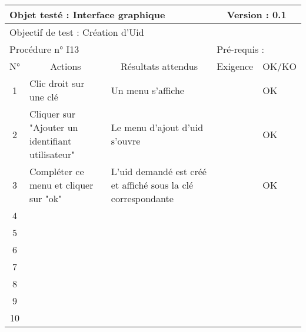 \documentclass{../res/univ-projet}
\begin{document}
\begin{center}
    \begin{tabular}{|c|p{5cm}|p{5cm}|p{1.5cm}|p{1.5cm}|}
      \hline
      \multicolumn{3}{|l|}{Objet testé : Interface graphique} & \multicolumn{2}{c|}{Version : 0.1}\\ \hline
      \multicolumn{5}{|l|}{Objectif de test : Création d'Uid}\\ \hline
      \multicolumn{3}{|l|}{Procédure n° I13} & \multicolumn{2}{p{3cm}|}{Pré-requis : }\\ \hline
      \multicolumn{1}{|c|}{N°} & \multicolumn{1}{c|}{Actions} & \multicolumn{1}{c|}{Résultats attendus} & 
      \multicolumn{1}{c|}{Exigence} & \multicolumn{1}{c|}{OK/KO}\\ \hline
      1 & Clic droit sur une clé & Un menu s'affiche &  & OK \\
      2 & Cliquer sur "Ajouter un identifiant utilisateur" & Le menu d'ajout d'uid s'ouvre &  & OK\\
      3 & Compléter ce menu et cliquer sur "ok" & L'uid demandé est créé et affiché sous la clé correspondante &  & OK\\ 
      4 &  &  &  & \\
      5 &  &  &  & \\
      6 &  &  &  & \\
      7 &  &  &  & \\
      8 &  &  &  & \\
      9 &  &  &  & \\
      10 &  &  &  &\\ 
	\hline
    \end{tabular}
    \vskip 2.2cm


\end{center}
\end{document}
